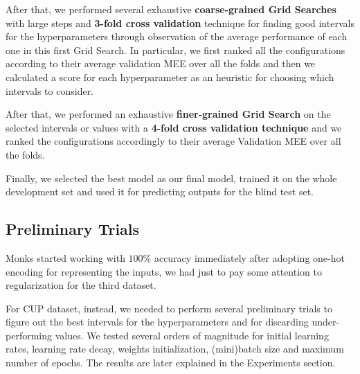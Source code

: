 After that, we performed several exhaustive \textbf{coarse-grained Grid Searches} with large steps and \textbf{3-fold cross validation} technique for finding good intervals for the hyperparameters through observation of the average performance of each one in this first Grid Search.
In particular, we first ranked all the configurations according to their average validation MEE over all the folds and then we calculated a score for each hyperparameter as an heuristic for choosing which intervals to consider.

After that, we performed an exhaustive \textbf{finer-grained Grid Search} on the selected intervals or values with a \textbf{4-fold cross validation technique} and we ranked the configurations accordingly to their average Validation MEE over all the folds.

Finally, we selected the best model as our final model, trained it on the whole development set and used it for predicting outputs for the blind test set.

\subsection{Preliminary Trials}
\label{subsection:preliminary_trials}
Monks started working with $100\%$ accuracy immediately after adopting one-hot encoding for representing the inputs, we had just to pay some attention to regularization for the third dataset.

For CUP dataset, instead, we needed to perform several preliminary trials to figure out the best intervals for the hyperparameters and for discarding under-performing values. We tested several orders of magnitude for initial learning rates, learning rate decay, weights initialization, (mini)batch size and maximum number of epochs. The results are later explained in the Experiments section.


